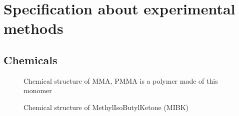 \pagestyle{fancy}
\chapter{Specification about experimental methods}
\section{Chemicals}
            \label{appendixresists}
           
            \begin{figure}[H]
            \centering
            \caption{Chemical structure of MMA, PMMA is a polymer made of this monomer}
            \label{PMMA}
            \end{figure}
                                   
            \begin{figure}[H]
                \centering
                \caption{Chemical structure of MethylIsoButylKetone (MIBK)}
                \label{MIBK}
            \end{figure}
            
